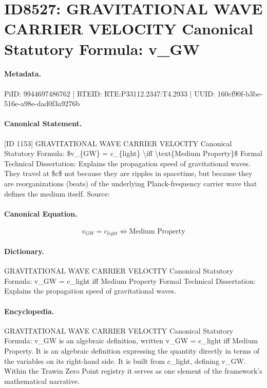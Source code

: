 \section*{ID8527: GRAVITATIONAL WAVE CARRIER VELOCITY Canonical Statutory Formula: v\_GW}
\paragraph{Metadata.}
PiID: 9944697486762 | RTEID: RTE:P33112.2347:T4.2933 | UUID: 160cf90f-b3be-516e-a98e-dad0f3a9276b

\paragraph{Canonical Statement.}
[ID 1153] GRAVITATIONAL WAVE CARRIER VELOCITY Canonical Statutory Formula: \$v\_\{GW\} = c\_\{light\} \textbackslash{}iff \textbackslash{}text\{Medium Property\}\$ Formal Technical Dissertation: Explains the propagation speed of gravitational waves. They travel at \$c\$ not because they are ripples in spacetime, but because they are reorganizations (beats) of the underlying Planck-frequency carrier wave that defines the medium itself. Source:

\paragraph{Canonical Equation.}
\[
v_{GW} = c_{light} \iff \text{Medium Property}
\]

\paragraph{Dictionary.}
GRAVITATIONAL WAVE CARRIER VELOCITY Canonical Statutory Formula: v\_GW = c\_light iff Medium Property Formal Technical Dissertation: Explains the propagation speed of gravitational waves.

\paragraph{Encyclopedia.}
GRAVITATIONAL WAVE CARRIER VELOCITY Canonical Statutory Formula: v\_GW is an algebraic definition, written v\_GW = c\_light iff Medium Property. It is an algebraic definition expressing the quantity directly in terms of the variables on its right-hand side. It is built from c\_light, defining v\_GW. Within the Trawin Zero Point registry it serves as one element of the framework's mathematical narrative.
